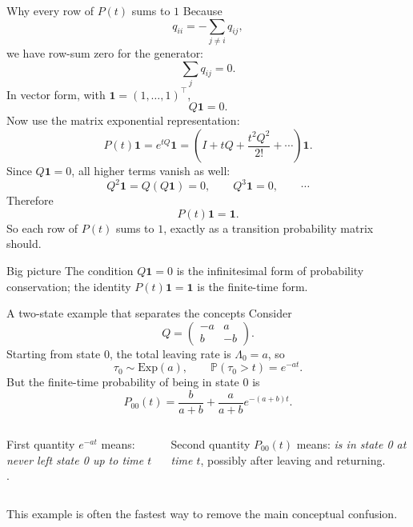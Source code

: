 \documentclass[aspectratio=169,professionalfonts]{beamer}
\newcommand{\Prob}{\mathbb{P}}
\begin{document}
\begin{frame}{Why every row of $P(t)$ sums to $1$}
\small
Because
\[
q_{ii}=-\sum_{j\neq i}q_{ij},
\]
we have row-sum zero for the generator:
\[
\sum_j q_{ij}=0.
\]
In vector form, with $\mathbf 1=(1,\dots,1)^\top$,
\[
Q\mathbf 1=0.
\]
Now use the matrix exponential representation:
\[
P(t)\mathbf 1=e^{tQ}\mathbf 1
=\left(I+tQ+\frac{t^2Q^2}{2!}+\cdots\right)\mathbf 1.
\]
Since $Q\mathbf 1=0$, all higher terms vanish as well:
\[
Q^2\mathbf 1=Q(Q\mathbf 1)=0,
\qquad Q^3\mathbf 1=0,
\qquad \cdots
\]
Therefore
\[
P(t)\mathbf 1=\mathbf 1.
\]
So each row of $P(t)$ sums to $1$, exactly as a transition probability matrix should.

\begin{block}{Big picture}
The condition $Q\mathbf 1=0$ is the infinitesimal form of probability conservation; the identity $P(t)\mathbf 1=\mathbf 1$ is the finite-time form.
\end{block}
\end{frame}

\begin{frame}{A two-state example that separates the concepts}
\small
Consider
\[
Q=
\begin{pmatrix}
-a & a\\
 b & -b
\end{pmatrix}.
\]
Starting from state $0$, the total leaving rate is $\Lambda_0=a$, so
\[
\tau_0\sim \mathrm{Exp}(a),
\qquad
\Prob(\tau_0>t)=e^{-at}.
\]
But the finite-time probability of being in state $0$ is
\[
P_{00}(t)=\frac{b}{a+b}+\frac{a}{a+b}e^{-(a+b)t}.
\]

\begin{columns}[T,totalwidth=\textwidth]
\begin{block}{First quantity}
$e^{-at}$ means: \emph{never left state 0 up to time $t$}.
\end{block}
\begin{alertblock}{Second quantity}
$P_{00}(t)$ means: \emph{is in state 0 at time $t$}, possibly after leaving and returning.
\end{alertblock}
\end{columns}

This example is often the fastest way to remove the main conceptual confusion.
\end{frame}
\end{document}
